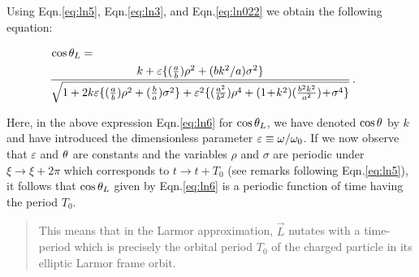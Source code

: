 Using Eqn.\eqref{eq:ln5}, Eqn.\eqref{eq:ln3}, and 
Eqn.\eqref{eq:ln022} we obtain the following equation:
\begin{small}
\begin{align}
&\nnnt\nnnt\nnnt\cos\gkq_{L} = \notag \\
    &\nnnt \nnnt \nnnt \frac{k + \varepsilon
\{(\frac{a}{b})\rho^{2} +
     (bk^{2}/a) \sigma^{2}\}}
     {\sqrt{1 + 2k \varepsilon \{(\frac{a}{b}) 
\rho^{2} +
(\frac{b}{a})\sigma^{2}\} +
     \varepsilon^{2} \{(\frac{a^{2}}{b^{2}})\rho^{4}
+ (1\nt + \nt k^{2}) 
(\frac{b^{2}k^{2}}{a^{2}})
    \nt+\nt \sigma^{4}\}}}\,.\notag\\
\label{eq:ln6}
\end{align}
\end{small} 
\nnt Here, in the above expression 
Eqn.\eqref{eq:ln6} for $\cos{\theta}_{L}$, we have denoted 
$\cos{\theta}$ by $k$ and have introduced the dimensionless 
parameter $\varepsilon \equiv {\omega}/{\omega}_{0}$. If we now 
observe that $\varepsilon$ and ${\theta}$ are constants and the 
variables $\rho$ and $\sigma$ are periodic under $\xi 
\rightarrow \xi + 2\pi$ which corresponds to $t \rightarrow 
t + T_{0}$ (see remarks following Eqn.\eqref{eq:ln5}), it 
follows that $\cos {\theta}_{L}$ given by Eqn.\eqref{eq:ln6} is 
a periodic function of time having the period $T_{0}$.
\begin{quote}
This means that in the Larmor approximation, $\vec{L}$ 
nutates with a time-period which is  precisely the 
orbital period $T_{0}$ of the charged particle in its 
elliptic Larmor frame orbit.
\end{quote}


